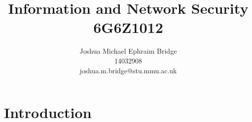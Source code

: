 \documentclass[12pt]{article}
\title{\vspace{2cm}\textbf{Information and Network Security}\\6G6Z1012}
\author{Joshua Michael Ephraim Bridge\\14032908\\joshua.m.bridge@stu.mmu.ac.uk}
\begin{document}
\maketitle

\tableofcontents

\newpage


\section{Introduction}


\newpage



\end{document}
